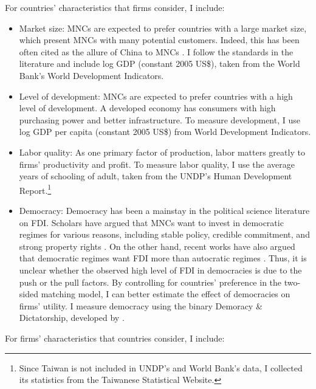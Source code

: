 For countries' characteristics that firms consider, I include:

\begin{itemize}
\item Market size: MNCs are expected to prefer countries with a large market size, which present MNCs with many potential customers. Indeed, this has been often cited as the allure of China to MNCs \citep{Luo2010}. I follow the standards in the literature and include log GDP (constant 2005 US\$), taken from the World Bank's World Development Indicators.

\item Level of development: MNCs are expected to prefer countries with a high level of development. A developed economy has consumers with high purchasing power and better infrastructure. To measure development, I use log GDP per capita (constant 2005 US\$) from World Development Indicators.

\item Labor quality: As one primary factor of production, labor matters greatly to firms' productivity and profit. To measure labor quality, I use the average years of schooling of adult, taken from the UNDP's Human Development Report.\footnote{Since Taiwan is not included in UNDP's and World Bank's data, I collected its statistics from the Taiwanese Statistical Website.}

\item Democracy: Democracy has been a mainstay in the political science literature on FDI. Scholars have argued that MNCs want to invest in democratic regimes for various reasons, including stable policy, credible commitment, and strong property rights \citep{Ahlquist2006, Li2003, Jensen2003}. On the other hand, recent works have also argued that democratic regimes want FDI more than autocratic regimes \citep{Pandya2016}. Thus, it is unclear whether the observed high level of FDI in democracies is due to the push or the pull factors. By controlling for countries' preference in the two-sided matching model, I can better estimate the effect of democracies on firms' utility. I measure democracy using the binary Demoracy \& Dictatorship, developed by \citet{Cheibub2009b}.
\end{itemize}

For firms' characteristics that countries consider, I include:

